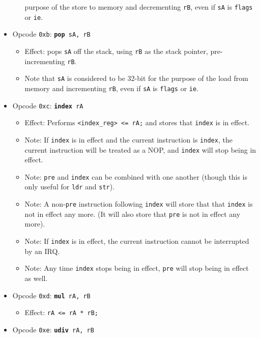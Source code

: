 \documentclass{article}
\begin{document}
\begin{itemize}
\begin{itemize}
		purpose of the store to memory and decrementing \texttt{rB},
		even if \texttt{sA} is \texttt{flags} or \texttt{ie}.
		\end{itemize}
	\item Opcode \texttt{0xb}:
		\texttt{\textbf{pop} sA, rB}
		\begin{itemize}
		\item Effect: pops \texttt{sA} off the stack, using
		\texttt{rB} as the stack pointer, pre-incrementing \texttt{rB}.
		\item Note that \texttt{sA} is considered to be 32-bit for the
		purpose of the load from memory and incrementing \texttt{rB},
		even if \texttt{sA} is \texttt{flags} or \texttt{ie}.
		\end{itemize}
	\item Opcode \texttt{0xc}:
		\texttt{\textbf{index} rA}
		\begin{itemize}
		\item Effect: Performs \texttt{<index\_reg> <= rA;} and stores
		that \texttt{index} is in effect.
		\item Note: If \texttt{index} is in effect and the current
		instruction is \texttt{index}, the current instruction will be
		treated as a NOP, and \texttt{index} will stop being in effect.
		\item Note: \texttt{pre} and \texttt{index} can be combined
		with one another (though this is only useful for \texttt{ldr}
		and \texttt{str}).
		\item Note: A non-\texttt{pre} instruction following
		\texttt{index} will store that that \texttt{index} is not in
		effect any more. (It will also store that \texttt{pre} is not
		in effect any more).
		\item Note: If \texttt{index} is in effect, the current
		instruction cannot be interrupted by an IRQ.
		\item Note: Any time \texttt{index} stops being in effect,
		\texttt{pre} will stop being in effect as well.
		\end{itemize}
	\item Opcode \texttt{0xd}:
		\texttt{\textbf{mul} rA, rB}
		\begin{itemize}
		\item Effect: \texttt{rA <= rA * rB;}
		\end{itemize}
	\item Opcode \texttt{0xe}:
		\texttt{\textbf{udiv} rA, rB}
		\begin{itemize}

\end{itemize}
\end{itemize}
\end{document}
